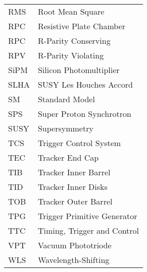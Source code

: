 \begin{supertabular}[l]{@{}l@{\ \ \ \ \ \ \ \ \ \ \ \ }l}
RMS        & Root Mean Square \\
RPC        & Resistive Plate Chamber \\
RPC        & R-Parity Conserving \\
RPV        & R-Parity Violating \\
SiPM       & Silicon Photomultiplier \\
SLHA       & SUSY Les Houches Accord \\
SM         & Standard Model \\
SPS        & Super Proton Synchrotron \\
SUSY       & Supersymmetry \\
TCS        & Trigger Control System \\
TEC        & Tracker End Cap \\
TIB        & Tracker Inner Barrel \\
TID        & Tracker Inner Disks \\
TOB        & Tracker Outer Barrel \\
TPG        & Trigger Primitive Generator \\
TTC        & Timing, Trigger and Control \\
VPT        & Vacuum Phototriode \\
WLS        & Wavelength-Shifting \\
\end{supertabular}